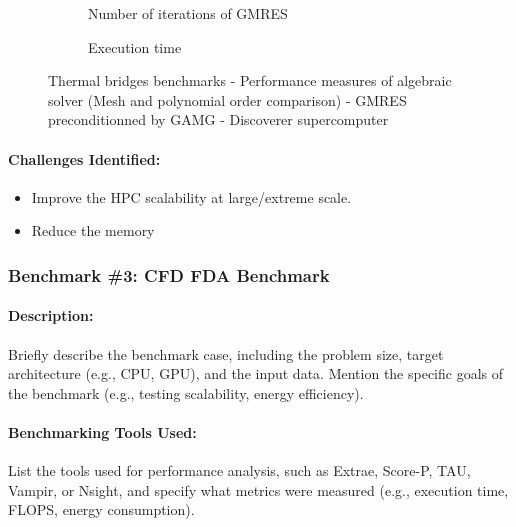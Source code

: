 \begin{figure}
  \begin{subfigure}[c]{\textwidth}
    \centering
    \caption{Number of iterations of GMRES}
  \end{subfigure}
  \begin{subfigure}[c]{\textwidth}
    \centering
    \caption{Execution time}
  \end{subfigure}
  \caption{Thermal bridges benchmarks - Performance measures of algebraic solver
    (Mesh and polynomial order comparison) - GMRES preconditionned by GAMG - Discoverer supercomputer}
  \label{fig:feelpp:wp3:thermal_bridges:performance_measure_all}
\end{figure}


\paragraph{Challenges Identified:} %

\begin{itemize}
\item Improve the HPC scalability at large/extreme scale.
\item Reduce the memory
\end{itemize}

\subsubsection{Benchmark \#3: CFD FDA Benchmark}

\paragraph{Description:} Briefly describe the benchmark case, including the problem size, target architecture (e.g., CPU, GPU), and the input data. Mention the specific goals of the benchmark (e.g., testing scalability, energy efficiency).

\paragraph{Benchmarking Tools Used:} List the tools used for performance analysis, such as Extrae, Score-P, TAU, Vampir, or Nsight, and specify what metrics were measured (e.g., execution time, FLOPS, energy consumption).

